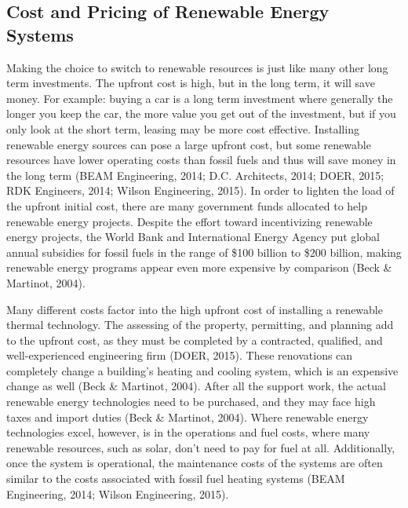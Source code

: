    \subsection{Cost and Pricing of Renewable Energy Systems}
    \par Making the choice to switch to renewable resources is just like many other long term investments. The upfront cost is high, but in the long term, it will save money. For example: buying a car is a long term investment where generally the longer you keep the car, the more value you get out of the investment, but if you only look at the short term, leasing may be more cost effective. Installing renewable energy sources can pose a large upfront cost, but some renewable resources have lower operating costs than fossil fuels and thus will save money in the long term (BEAM Engineering, 2014; D.C. Architects, 2014; DOER, 2015; RDK Engineers, 2014; Wilson Engineering, 2015). In order to lighten the load of the upfront initial cost, there are many government funds allocated to help renewable energy projects. Despite the effort toward incentivizing renewable energy projects, the World Bank and International Energy Agency put global annual subsidies for fossil fuels in the range of \$100 billion to \$200 billion, making renewable energy programs appear even more expensive by comparison (Beck \& Martinot, 2004).
    \par Many different costs factor into the high upfront cost of installing a renewable thermal technology. The assessing of the property, permitting, and planning add to the upfront cost, as they must be completed by a contracted, qualified, and well-experienced engineering firm (DOER, 2015). These renovations can completely change a building's heating and cooling system, which is an expensive change as well (Beck \& Martinot, 2004). After all the support work, the actual renewable energy technologies need to be purchased, and they may face high taxes and import duties (Beck \& Martinot, 2004). Where renewable energy technologies excel, however, is in the operations and fuel costs, where many renewable resources, such as solar, don't need to pay for fuel at all. Additionally, once the system is operational, the maintenance costs of the systems are often similar to the costs associated with fossil fuel heating systems (BEAM Engineering, 2014; Wilson Engineering, 2015).

